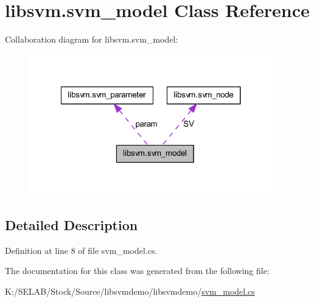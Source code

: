 \hypertarget{classlibsvm_1_1svm__model}{
\section{libsvm.svm\_\-model Class Reference}
\label{classlibsvm_1_1svm__model}
}


Collaboration diagram for libsvm.svm\_\-model:
\nopagebreak
\begin{figure}[H]
\begin{center}
\leavevmode
\includegraphics[width=300pt]{classlibsvm_1_1svm__model__coll__graph}
\end{center}
\end{figure}


\subsection{Detailed Description}


Definition at line 8 of file svm\_\-model.cs.



The documentation for this class was generated from the following file:\begin{DoxyCompactItemize}
\item 
K:/SELAB/Stock/Source/libsvmdemo/libsvmdemo/\hyperlink{svm__model_8cs}{svm\_\-model.cs}\end{DoxyCompactItemize}
